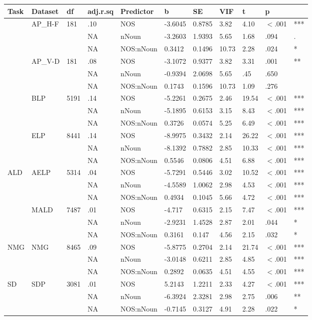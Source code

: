 \begin{table}[ht]
\centering
\begingroup\normalsize
\begin{tabular}{lllllllllll}
  \hline
Task & Dataset & df & adj.r.sq & Predictor & b & SE & VIF & t & p &  \\ 
  \hline
 & AP\_H-F & 181 & .10 & NOS & -3.6045 & 0.8785 & 3.82 & 4.10 & $<$.001 & *** \\ 
   &  &  & NA & nNoun & -3.2603 & 1.9393 & 5.65 & 1.68 & .094 & . \\ 
   &  &  & NA & NOS:nNoun & 0.3412 & 0.1496 & 10.73 & 2.28 & .024 & * \\ 
   & AP\_V-D & 181 & .08 & NOS & -3.1072 & 0.9377 & 3.82 & 3.31 & .001 & ** \\ 
   &  &  & NA & nNoun & -0.9394 & 2.0698 & 5.65 & .45 & .650 &   \\ 
   &  &  & NA & NOS:nNoun & 0.1743 & 0.1596 & 10.73 & 1.09 & .276 &   \\ 
   & BLP & 5191 & .14 & NOS & -5.2261 & 0.2675 & 2.46 & 19.54 & $<$.001 & *** \\ 
   &  &  & NA & nNoun & -5.1895 & 0.6153 & 3.15 & 8.43 & $<$.001 & *** \\ 
   &  &  & NA & NOS:nNoun & 0.3726 & 0.0574 & 5.25 & 6.49 & $<$.001 & *** \\ 
   & ELP & 8441 & .14 & NOS & -8.9975 & 0.3432 & 2.14 & 26.22 & $<$.001 & *** \\ 
   &  &  & NA & nNoun & -8.1392 & 0.7882 & 2.85 & 10.33 & $<$.001 & *** \\ 
   &  &  & NA & NOS:nNoun & 0.5546 & 0.0806 & 4.51 & 6.88 & $<$.001 & *** \\ 
  ALD & AELP & 5314 & .04 & NOS & -5.7291 & 0.5446 & 3.02 & 10.52 & $<$.001 & *** \\ 
   &  &  & NA & nNoun & -4.5589 & 1.0062 & 2.98 & 4.53 & $<$.001 & *** \\ 
   &  &  & NA & NOS:nNoun & 0.4934 & 0.1045 & 5.66 & 4.72 & $<$.001 & *** \\ 
   & MALD & 7487 & .01 & NOS & -4.717 & 0.6315 & 2.15 & 7.47 & $<$.001 & *** \\ 
   &  &  & NA & nNoun & -2.9231 & 1.4528 & 2.87 & 2.01 & .044 & * \\ 
   &  &  & NA & NOS:nNoun & 0.3161 & 0.147 & 4.56 & 2.15 & .032 & * \\ 
  NMG & NMG & 8465 & .09 & NOS & -5.8775 & 0.2704 & 2.14 & 21.74 & $<$.001 & *** \\ 
   &  &  & NA & nNoun & -3.0148 & 0.6211 & 2.85 & 4.85 & $<$.001 & *** \\ 
   &  &  & NA & NOS:nNoun & 0.2892 & 0.0635 & 4.51 & 4.55 & $<$.001 & *** \\ 
  SD & SDP & 3081 & .01 & NOS & 5.2143 & 1.2211 & 2.33 & 4.27 & $<$.001 & *** \\ 
   &  &  & NA & nNoun & -6.3924 & 2.3281 & 2.98 & 2.75 & .006 & ** \\ 
   &  &  & NA & NOS:nNoun & -0.7145 & 0.3127 & 4.91 & 2.28 & .022 & * \\ 
   \hline
\end{tabular}
\endgroup
\end{table}
